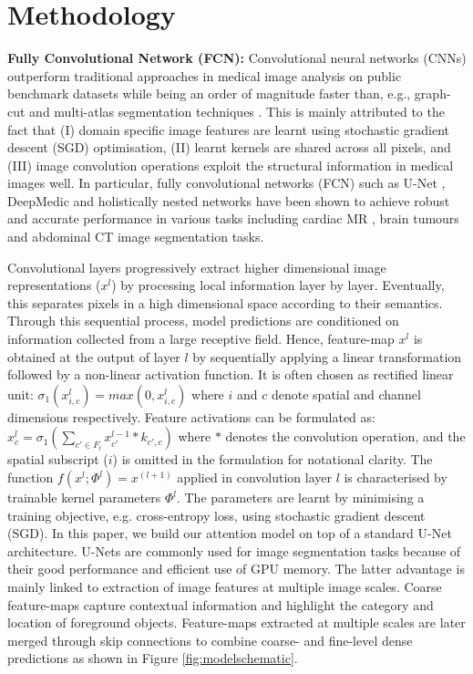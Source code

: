 \documentclass{article}
\begin{document}
\section{Methodology}

\textbf{Fully Convolutional Network (FCN):} Convolutional neural networks (CNNs) outperform traditional approaches in medical image analysis on public benchmark datasets \cite{khened2018fully, liao2017evaluate} while being an order of magnitude faster than, e.g., graph-cut and multi-atlas segmentation techniques \cite{wolz2013automated}. This is mainly attributed to the fact that (I) domain specific image features are learnt using stochastic gradient descent (SGD) optimisation, (II) learnt kernels are shared across all pixels, and (III) image convolution operations exploit the structural information in medical images well. In particular, fully convolutional networks (FCN) \cite{long2015fully} such as U-Net \cite{ronneberger2015u}, DeepMedic \cite{kamnitsas2017efficient} and holistically nested networks \cite{lee2015deeply, xie2015holistically} have been shown to achieve robust and accurate performance in various tasks including cardiac MR \cite{bai2017human}, brain tumours \cite{kamnitsas2018ensembles} and abdominal CT \cite{roth2018media, roth2017hierarchical} image segmentation tasks.

Convolutional layers progressively extract higher dimensional image representations ($x^l$) by processing local information layer by layer. Eventually, this separates pixels in a high dimensional space according to their semantics. Through this sequential process, model predictions are conditioned on information collected from a large receptive field. Hence, feature-map $x^l$ is obtained at the output of layer $l$ by sequentially applying a linear transformation followed by a non-linear activation function. It is often chosen as rectified linear unit: $\sigma_1(x_{i,c}^l) = max (0, x_{i,c}^l)$ where $i$ and $c$ denote spatial and channel dimensions respectively. Feature activations can be formulated as: $x_c^l= \sigma_1 \left(  \sum_{c' \in F_l}  x_{c'}^{l-1} * k_{c' , c} \right)$ where $*$ denotes the convolution operation, and the spatial subscript ($i$) is omitted in the formulation for notational clarity. The function $f (x^{l} ; \Phi^{l}) = x^{(l+1)}$ applied in convolution layer $l$ is characterised by trainable kernel parameters $\Phi^{l}$. The parameters are learnt by minimising a training objective, e.g. cross-entropy loss, using stochastic gradient descent (SGD). In this paper, we build our attention model on top of a standard U-Net architecture. U-Nets are commonly used for image segmentation tasks because of their good performance and efficient use of GPU memory. The latter advantage is mainly linked to extraction of image features at multiple image scales. Coarse feature-maps capture contextual information and highlight the category and location of foreground objects. Feature-maps extracted at multiple scales are later merged through skip connections to combine coarse- and fine-level dense predictions as shown in Figure \ref{fig:modelschematic}. 
\end{document}
